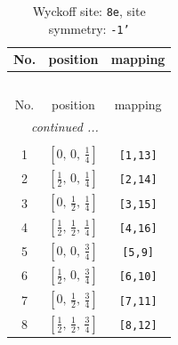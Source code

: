 \documentclass[fleqn,8pt]{jsarticle}
\begin{document}
\renewcommand{\arraystretch}{1.2}
\begin{longtable}{ccc}
\caption{Wyckoff site: {\tt 8e}, site symmetry: {\tt -1'}}
 \\
 \hline \hline
No. & position & mapping \\ \hline \endfirsthead

\multicolumn{2}{l}{\tablename\ \thetable{}} \\
 \hline \hline
No. & position & mapping \\ \hline \endhead

 \hline \hline
\multicolumn{2}{r}{\footnotesize\it continued ...} \\ \endfoot

 \hline \hline
\multicolumn{2}{r}{} \\ \endlastfoot

1 & $\left[ 0,\, 0,\, \frac{1}{4} \right]$ & {\tt [1,13]} \\ \hline
2 & $\left[ \frac{1}{2},\, 0,\, \frac{1}{4} \right]$ & {\tt [2,14]} \\ \hline
3 & $\left[ 0,\, \frac{1}{2},\, \frac{1}{4} \right]$ & {\tt [3,15]} \\ \hline
4 & $\left[ \frac{1}{2},\, \frac{1}{2},\, \frac{1}{4} \right]$ & {\tt [4,16]} \\ \hline
5 & $\left[ 0,\, 0,\, \frac{3}{4} \right]$ & {\tt [5,9]} \\ \hline
6 & $\left[ \frac{1}{2},\, 0,\, \frac{3}{4} \right]$ & {\tt [6,10]} \\ \hline
7 & $\left[ 0,\, \frac{1}{2},\, \frac{3}{4} \right]$ & {\tt [7,11]} \\ \hline
8 & $\left[ \frac{1}{2},\, \frac{1}{2},\, \frac{3}{4} \right]$ & {\tt [8,12]} \\
\end{longtable}
\renewcommand{\arraystretch}{1.2}
\end{document}

